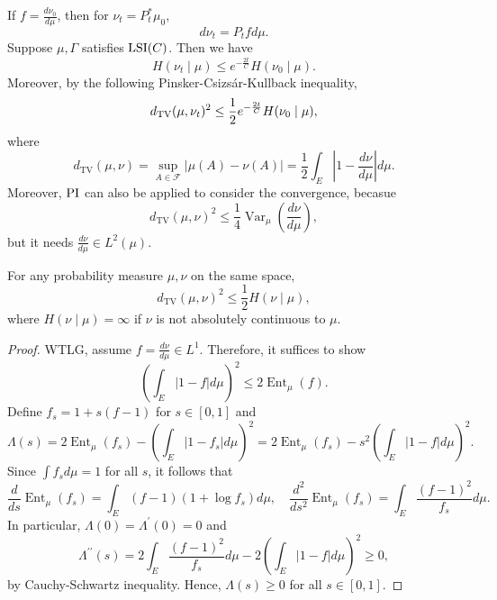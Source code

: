If $f = \frac{d\nu_0}{d\mu}$, then for $\nu_t = P_t^*\mu_0$,
\begin{equation*}
    d\nu_t = P_t f d\mu.
\end{equation*}
Suppose $\mu,\Gamma$ satisfies $\operatorname{LSI}(C)$. Then we have
\begin{equation*}
    H(\nu_t \mid \mu) \leq e^{-\frac{2t}{C}}H(\nu_0 \mid \mu).
\end{equation*}
Moreover, by the following Pinsker-Csizs\'ar-Kullback inequality,
\begin{equation*}
    d_{\operatorname{TV}}(\mu,\nu_t)^2 \leq \frac{1}{2}e^{-\frac{2t}{C}}H(\nu_0 \mid \mu),
\end{equation*}
where
\begin{equation*}
    d_{\mathrm{TV}}(\mu, \nu)=\sup _{A \in \mathcal{F}}|\mu(A)-\nu(A)| = \frac{1}{2} \int_E\left|1-\frac{d \nu}{d \mu}\right| d \mu.
\end{equation*}
Moreover, $\operatorname{PI}$ can also be applied to consider the convergence, becasue
\begin{equation*}
    d_{\mathrm{TV}}(\mu, \nu)^2 \leq \frac{1}{4} \operatorname{Var}_\mu\left(\frac{d \nu}{d \mu}\right),
\end{equation*}
but it needs $\frac{d \nu}{d \mu} \in L^2(\mu)$.

\begin{prop}
    For any probability measure $\mu,\nu$ on the same space,
    \begin{equation*}
        d_{\mathrm{TV}}(\mu, \nu)^2 \leq \frac{1}{2} H(\nu \mid \mu),
    \end{equation*}
    where $H(\nu \mid \mu) = \infty$ if $\nu$ is not absolutely continuous to $\mu$.
\end{prop}
\begin{proof}
    WTLG, assume $f = \frac{d\nu}{d\mu} \in L^1$. Therefore, it suffices to show
    \begin{equation*}
        \left(\int_E|1-f| d \mu\right)^2 \leq 2 \operatorname{Ent}_\mu(f).
    \end{equation*}
    Define $f_s = 1 + s(f - 1)$ for $s \in [0,1]$ and
    \begin{equation*}
        \Lambda(s)=2 \operatorname{Ent}_\mu\left(f_s\right)-\left(\int_E\left|1-f_s\right| d \mu\right)^2=2 \operatorname{Ent}_\mu\left(f_s\right)-s^2\left(\int_E|1-f| d \mu\right)^2.
    \end{equation*}
    Since $\int f_s d\mu = 1$ for all $s$, it follows that
    \begin{equation*}
        \frac{d}{d s} \operatorname{Ent}_\mu\left(f_s\right)=\int_E(f-1)\left(1+\log f_s\right) d \mu,\quad \frac{d^2}{d s^2} \operatorname{Ent}_\mu\left(f_s\right)=\int_E \frac{(f-1)^2}{f_s} d \mu.
    \end{equation*}
    In particular, $\Lambda(0) = \Lambda^\prime(0) =0$ and
    \begin{equation*}
        \Lambda^{\prime \prime}(s)=2 \int_E \frac{(f-1)^2}{f_s} d \mu-2\left(\int_E|1-f| d \mu\right)^2 \geq 0,
    \end{equation*}
    by Cauchy-Schwartz inequality. Hence, $\Lambda(s) \geq 0$ for all $s \in [0,1]$.
\end{proof}

